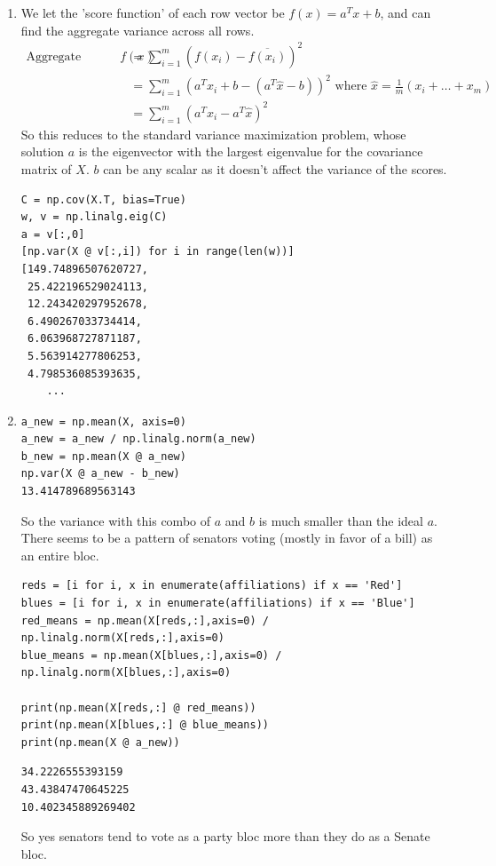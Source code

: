 \documentclass[11pt]{article}
\begin{document}
\begin{solution}
\begin{enumerate}
\item We let the 'score function' of each row vector be $f(x) = a^T x + b$, and can find the aggregate variance across all rows.
    \begin{align*}
        \text{Aggregate variance of } f(x) &= \sum_{i=1}^m (f(x_i) - \overline{f(x_i)})^2 \\
        &= \sum_{i=1}^m (a^T x_i + b - (a^T \hat{x} - b))^2 \text{ where } \hat{x} = \frac{1}{m}(x_i + \dots + x_m) \\
        &= \sum_{i=1}^m (a^T x_i - a^T \hat{x})^2
    \end{align*}
    So this reduces to the standard variance maximization problem, whose solution $a$ is the eigenvector with the largest eigenvalue for the covariance matrix of $X$. $b$ can be any scalar as it doesn't affect the variance of the scores.
\begin{verbatim}
C = np.cov(X.T, bias=True)
w, v = np.linalg.eig(C)
a = v[:,0]
[np.var(X @ v[:,i]) for i in range(len(w))]
[149.74896507620727,
 25.422196529024113,
 12.243420297952678,
 6.490267033734414,
 6.063968727871187,
 5.563914277806253,
 4.798536085393635,
    ...
\end{verbatim}

\item
\begin{verbatim}
a_new = np.mean(X, axis=0)
a_new = a_new / np.linalg.norm(a_new)
b_new = np.mean(X @ a_new)
np.var(X @ a_new - b_new)
13.414789689563143
\end{verbatim}
So the variance with this combo of $a$ and $b$ is much smaller than the ideal $a$.
There seems to be a pattern of senators voting (mostly in favor of a bill) as an entire bloc.
\begin{verbatim}
reds = [i for i, x in enumerate(affiliations) if x == 'Red']
blues = [i for i, x in enumerate(affiliations) if x == 'Blue']
red_means = np.mean(X[reds,:],axis=0) / np.linalg.norm(X[reds,:],axis=0)
blue_means = np.mean(X[blues,:],axis=0) / np.linalg.norm(X[blues,:],axis=0)

print(np.mean(X[reds,:] @ red_means))
print(np.mean(X[blues,:] @ blue_means))
print(np.mean(X @ a_new))
\end{verbatim}
\begin{verbatim}
34.2226555393159
43.43847470645225
10.402345889269402
\end{verbatim}
So yes senators tend to vote as a party bloc more than they do as a Senate bloc.


\end{enumerate}
\end{solution}
\end{document}
